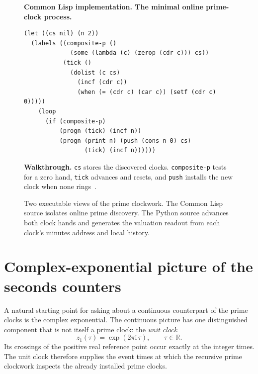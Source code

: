 \documentclass[11pt,a4paper]{article}
\theoremstyle{clockplain}
\theoremstyle{definition}
\theoremstyle{remark}
\begin{document}
\begin{figure}[H]
\begin{minipage}{0.96\textwidth}
\vspace{1mm}
\textbf{Common Lisp implementation. The minimal online prime-clock process.}
\begin{lstlisting}[style=clocklisp]
(let ((cs nil) (n 2))
  (labels ((composite-p ()
             (some (lambda (c) (zerop (cdr c))) cs))
           (tick ()
             (dolist (c cs)
               (incf (cdr c))
               (when (= (cdr c) (car c)) (setf (cdr c) 0)))))
    (loop
      (if (composite-p)
          (progn (tick) (incf n))
          (progn (print n) (push (cons n 0) cs)
                 (tick) (incf n))))))
\end{lstlisting}
\textbf{Walkthrough.} \texttt{cs} stores the discovered clocks. \texttt{composite-p} tests for a zero hand, \texttt{tick} advances and resets, and \texttt{push} installs the new clock when none rings~\cite{EmmerichLisp2025}.
\end{minipage}
\caption{Two executable views of the prime clockwork. The Common Lisp source isolates online prime discovery. The Python source advances both clock hands and generates the valuation readout from each clock's minutes address and local history.}
\label{fig:clockwork-source}
\end{figure}

\clearpage
\section{Complex-exponential picture of the seconds counters}
\label{app:complex}

A natural starting point for asking about a continuous counterpart of the prime clocks is the complex exponential. The continuous picture has one distinguished component that is not itself a prime clock: the \emph{unit clock}
\begin{equation}
z_1(\tau)=\exp(2\pi\mathrm{i}\,\tau),\qquad \tau\in\mathbb R.
\label{eq:unit-clock}
\end{equation}
Its crossings of the positive real reference point occur exactly at the integer times. The unit clock therefore supplies the event times at which the recursive prime clockwork inspects the already installed prime clocks.
\end{document}
